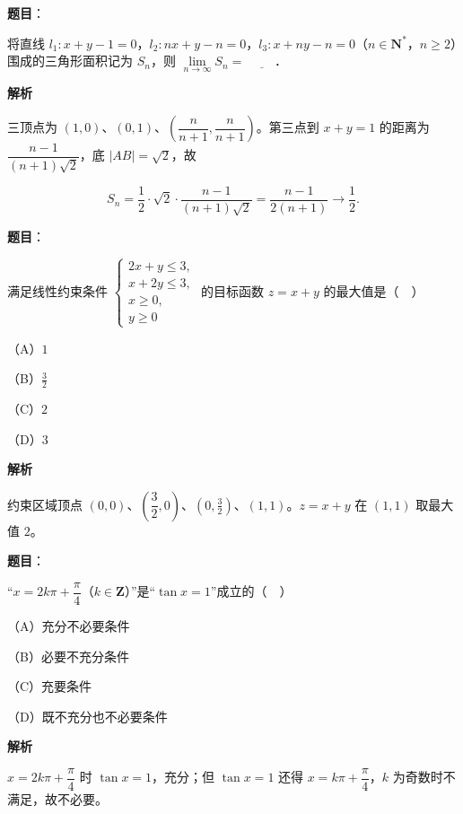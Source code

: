\begin{answer}

\textbf{题目}：

将直线 $l_1:x+y-1=0$，$l_2:nx+y-n=0$，$l_3:x+ny-n=0$（$n\in\mathbf N^*$，$n\geqslant2$）围成的三角形面积记为 $S_n$，则 $\lim\limits_{n\to\infty}S_n=$ $\underline{\qquad}$．

\textbf{解析}

三顶点为 $(1,0)$、$(0,1)$、$\left(\dfrac n{n+1},\dfrac n{n+1}\right)$。第三点到 $x+y=1$ 的距离为 $\dfrac{n-1}{(n+1)\sqrt2}$，底 $|AB|=\sqrt2$，故

\nopagebreak[4]
\[S_n=\frac12\cdot\sqrt2\cdot\frac{n-1}{(n+1)\sqrt2}
=\frac{n-1}{2(n+1)}\to\frac12.\]


\end{answer}
\begin{answer}

\textbf{题目}：

满足线性约束条件 $\begin{cases}2x+y\leqslant3,\\ x+2y\leqslant3,\\ x\geqslant0,\\ y\geqslant0\end{cases}$ 的目标函数 $z=x+y$ 的最大值是（　）

（A）$1$

（B）$\frac32$

（C）$2$

（D）$3$

\textbf{解析}

约束区域顶点 $(0,0)$、$\left(\dfrac32,0\right)$、$(0,\frac32)$、$(1,1)$。$z=x+y$ 在 $(1,1)$ 取最大值 $2$。


\end{answer}
\begin{answer}

\textbf{题目}：

“$x=2k\pi+\dfrac\pi4$（$k\in\mathbf Z$）”是“$\tan x=1$”成立的（　）

（A）充分不必要条件

（B）必要不充分条件

（C）充要条件

（D）既不充分也不必要条件

\textbf{解析}

$x=2k\pi+\dfrac\pi4$ 时 $\tan x=1$，充分；但 $\tan x=1$ 还得 $x=k\pi+\dfrac\pi4$，$k$ 为奇数时不满足，故不必要。


\end{answer}
